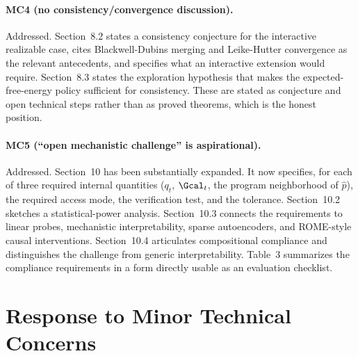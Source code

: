\documentclass[11pt]{article}
\begin{document}
\paragraph{MC4 (no consistency/convergence discussion).} Addressed. Section~8.2 states a consistency conjecture for the interactive realizable case, cites Blackwell-Dubins merging and Leike-Hutter convergence as the relevant antecedents, and specifies what an interactive extension would require. Section~8.3 states the exploration hypothesis that makes the expected-free-energy policy sufficient for consistency. These are stated as conjecture and open technical steps rather than as proved theorems, which is the honest position.

\paragraph{MC5 (``open mechanistic challenge'' is aspirational).} Addressed. Section~10 has been substantially expanded. It now specifies, for each of three required internal quantities ($q_t$, $\Gcal_t$, the program neighborhood of $\hat p$), the required access mode, the verification test, and the tolerance. Section~10.2 sketches a statistical-power analysis. Section~10.3 connects the requirements to linear probes, mechanistic interpretability, sparse autoencoders, and ROME-style causal interventions. Section~10.4 articulates compositional compliance and distinguishes the challenge from generic interpretability. Table~3 summarizes the compliance requirements in a form directly usable as an evaluation checklist.

\section*{Response to Minor Technical Concerns}
\end{document}
